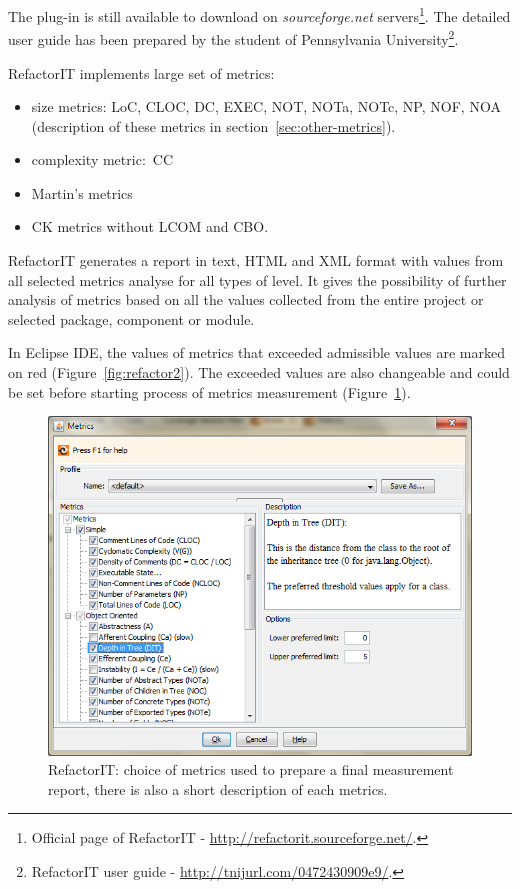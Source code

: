 The plug-in is still available to download on \textit{sourceforge.net} servers\footnote{Official page of RefactorIT - \url{http://refactorit.sourceforge.net/}.}. The detailed user guide has been prepared by the student of Pennsylvania University\footnote{RefactorIT user guide - \url{http://tnijurl.com/0472430909e9/}.}.  

RefactorIT implements large set of metrics:
\begin{itemize}
\item size metrics: \ac{LoC}, \ac{CLOC}, \ac{DC}, \ac{EXEC}, \ac{NOT}, \ac{NOTa}, \ac{NOTc}, \ac{NP}, \ac{NOF}, \ac{NOA} (description of these metrics in section~\ref{sec:other-metrics}).
\item complexity metric:~\ac{CC}
\item Martin's metrics
\item \ac{CK metrics} without \ac{LCOM} and \ac{CBO}.
\end{itemize}
 
RefactorIT generates a report in text, HTML and XML format with values from all selected metrics analyse for all types of level. It gives the possibility of further analysis of metrics based on all the values collected from the entire project or selected package, component or module. 
 
In Eclipse IDE, the values of metrics that  exceeded admissible values are marked on red (Figure~\ref{fig:refactor2}). The exceeded values are also changeable and could be set before starting process of metrics measurement (Figure~\ref{fig:refactor1}). 
 
\begin{figure}[h!]
 	\centering
 	 \includegraphics[scale=0.6]{img/refactorit1.png} 
 	\caption{RefactorIT: choice of metrics used to prepare a final measurement report, there is also a short description of each metrics.}		
 	\label{fig:refactor1}
 \end{figure} 

